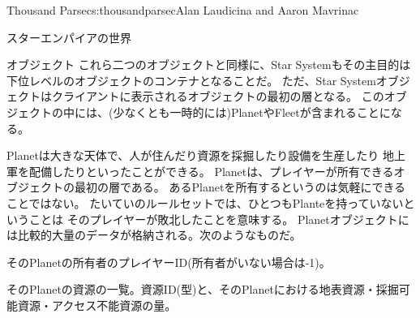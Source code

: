 \begin{aosachapter}{Thousand Parsec}{s:thousandparsec}{Alan Laudicina and Aaron Mavrinac}
\begin{aosasect1}{スターエンパイアの世界}
\begin{aosasect2}{オブジェクト}
これら二つのオブジェクトと同様に、Star Systemもその主目的は下位レベルのオブジェクトのコンテナとなることだ。
ただ、Star Systemオブジェクトはクライアントに表示されるオブジェクトの最初の層となる。
このオブジェクトの中には、(少なくとも一時的には)PlanetやFleetが含まれることになる。

Planetは大きな天体で、人が住んだり資源を採掘したり設備を生産したり
地上軍を配備したりといったことができる。
Planetは、プレイヤーが所有できるオブジェクトの最初の層である。
あるPlanetを所有するというのは気軽にできることではない。
たいていのルールセットでは、ひとつもPlanteを持っていないということは
そのプレイヤーが敗北したことを意味する。
Planetオブジェクトには比較的大量のデータが格納される。次のようなものだ。

\begin{aosaitemize}

  \item そのPlanetの所有者のプレイヤーID(所有者がいない場合は-1)。

  \item そのPlanetの資源の一覧。資源ID(型)と、そのPlanetにおける地表資源・採掘可能資源・アクセス不能資源の量。

\end{aosaitemize}


\end{aosasect2}
\end{aosasect1}
\end{aosachapter}
